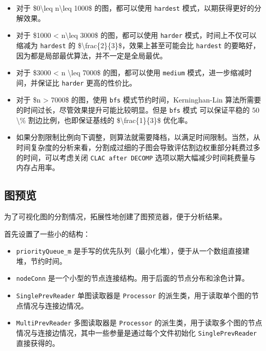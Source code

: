 \documentclass[
]{article}
\begin{document}
\begin{itemize}
\item
  对于 \$0\textbackslash leq n\textbackslash leq 1000\$ 的图，都可以使用
  \texttt{hardest} 模式，以期获得更好的分解效果。
\item
  对于 \$1000 \textless{} n\textbackslash leq 3000\$ 的图，都可以使用
  \texttt{harder} 模式，时间上不仅可以缩减为 \texttt{hardest} 的
  \$\textbackslash frac\{2\}\{3\}\$，效果上甚至可能会比 \texttt{hardest}
  的要略好，因为都是局部最优算法，并不一定是全局最优。
\item
  对于 \$3000 \textless{} n \textbackslash leq 7000\$ 的图，都可以使用
  \texttt{medium} 模式，进一步缩减时间，并保证比 \texttt{harder}
  更高的性价比。
\item
  对于 \$n \textgreater{} 7000\$ 的图，使用 \texttt{bfs}
  模式节约时间，Kerninghan-Lin
  算法所需要的时间过长，尽管效果提升可能比较明显。但是 \texttt{bfs} 模式
  可以保证平稳的 50 \textbackslash\% 割边比例，也即保证基线的
  \$\textbackslash frac\{1\}\{3\}\$ 优化率。
\item
  如果分割限制比例向下调整，则算法就需要降档，以满足时间限制。当然，从时间复杂度的分析来看，分割成过细的子图会导致评估割边权重部分耗费过多的时间，可以考虑关闭
  \texttt{CLAC\ after\ DECOMP} 选项以期大幅减少时间耗费量与内存占用率。
\end{itemize}

\hypertarget{header-n227}{%
\subsection{图预览}\label{header-n227}}

为了可视化图的分割情况，拓展性地创建了图预览器，便于分析结果。

首先设置了一些小的结构：

\begin{itemize}
\item
  \texttt{priorityQueue\_m}
  是手写的优先队列（最小化堆），便于从一个数组直接建堆，节约时间。
\item
  \texttt{nodeConn}
  是一个小型的节点连接结构。用于后面的节点分布和涂色计算。
\item
  \texttt{SinglePrevReader} 单图读取器是 \texttt{Processor}
  的派生类，用于读取单个图的节点情况与连接边情况。
\item
  \texttt{MultiPrevReader} 多图读取器是 \texttt{Processor}
  的派生类，用于读取多个图的节点情况与连接边情况，其中一些参量是通过每个文件初始化
  \texttt{SinglePrevReader} 直接获得的。
\end{itemize}
\end{document}
